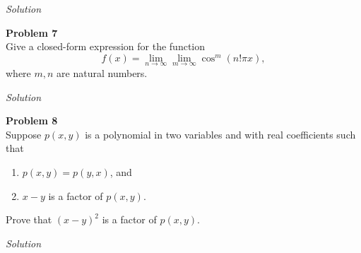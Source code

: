 \documentclass{amsart}
\begin{document}
\textit{Solution}\\

\pagebreak

\textbf{Problem 7}\\
Give a closed-form expression for the function
\[ f(x) = \lim_{n \to \infty} \lim_{m \to \infty} \cos^m(n!\pi x), \]
where $m,n$ are natural numbers.

\textit{Solution}\\

\pagebreak

\textbf{Problem 8}\\
Suppose $p(x,y)$ is a polynomial in two variables and with real coefficients such that
\begin{enumerate}
\item $p(x,y) = p(y,x)$, and
\item $x - y$ is a factor of $p(x,y)$.
\end{enumerate}
Prove that $(x - y)^2$ is a factor of $p(x,y)$.

\textit{Solution}\\
\end{document}
